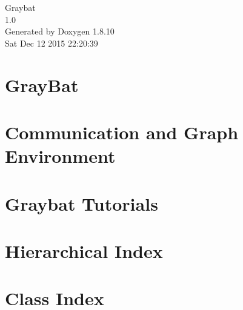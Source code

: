 \documentclass[twoside]{book}
\newcommand{\+}{\discretionary{\mbox{\scriptsize$\hookleftarrow$}}{}{}}
\newcommand{\clearemptydoublepage}{%
  \newpage{\pagestyle{empty}\cleardoublepage}%
}
\begin{document}
\hypersetup{pageanchor=false,
             bookmarks=true,
             bookmarksnumbered=true,
             pdfencoding=unicode
            }
\begin{titlepage}
\vspace*{7cm}
\begin{center}%
{\Large Graybat \\[1ex]\large 1.\+0 }\\
\vspace*{1cm}
{\large Generated by Doxygen 1.8.10}\\
\vspace*{0.5cm}
{\small Sat Dec 12 2015 22:20:39}\\
\end{center}
\end{titlepage}
\clearemptydoublepage
\tableofcontents
\clearemptydoublepage
{}
\hypersetup{pageanchor=true}

\chapter{Gray\+Bat}
\label{index}\hypertarget{index}{}
\chapter{Communication and Graph Environment}
\label{cage}
\hypertarget{cage}{}

\chapter{Graybat Tutorials}
\label{tutorial}
\hypertarget{tutorial}{}

\chapter{Hierarchical Index}

\chapter{Class Index}

\end{document}
